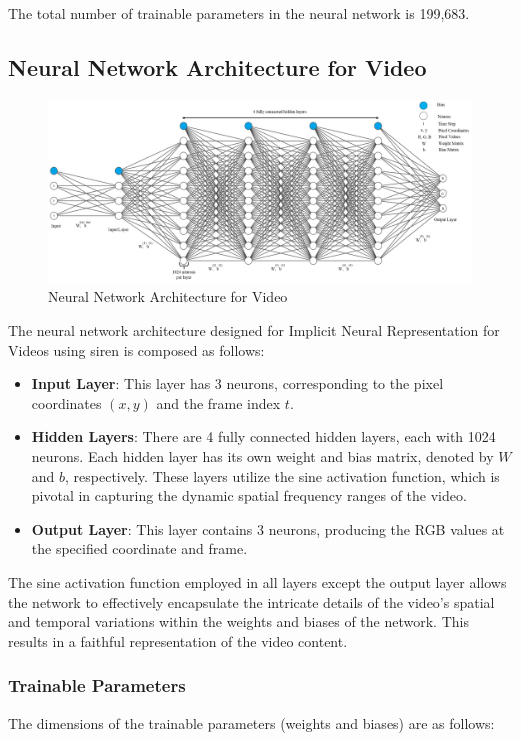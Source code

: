 \documentclass{ioereport}
\begin{document}
The total number of trainable parameters in the neural network is 199,683.


\subsection{Neural Network Architecture for Video}
\begin{figure}[H]
    \centering
    \includegraphics[width=\linewidth]{assets/video_neural.png}
    \caption{Neural Network Architecture for Video}
    \label{fig:arch-video}
\end{figure}

The neural network architecture designed for Implicit Neural Representation for Videos using \gls{siren} is composed as follows:

\begin{itemize}
    \item \textbf{Input Layer}: This layer has 3 neurons, corresponding to the pixel coordinates \( (x, y) \) and the frame index \( t \).
    \item \textbf{Hidden Layers}: There are 4 fully connected hidden layers, each with 1024 neurons. Each hidden layer has its own weight and bias matrix, denoted by \(W\) and \(b\), respectively. These layers utilize the sine activation function, which is pivotal in capturing the dynamic spatial frequency ranges of the video.
    \item \textbf{Output Layer}: This layer contains 3 neurons, producing the RGB values at the specified coordinate and frame.
\end{itemize}

The sine activation function employed in all layers except the output layer allows the network to effectively encapsulate the intricate details of the video's spatial and temporal variations within the weights and biases of the network. This results in a faithful representation of the video content.

\subsubsection*{Trainable Parameters}
The dimensions of the trainable parameters (weights and biases) are as follows:
\end{document}
